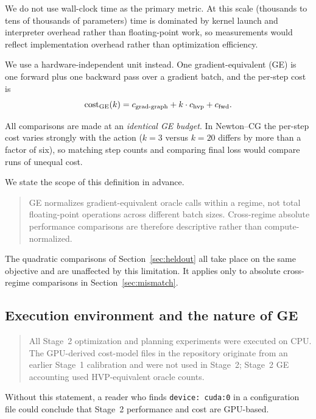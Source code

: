 We do not use wall-clock time as the primary metric. At this scale (thousands to
tens of thousands of parameters) time is dominated by kernel launch and
interpreter overhead rather than floating-point work, so measurements would
reflect implementation overhead rather than optimization efficiency.

We use a hardware-independent unit instead. One gradient-equivalent (GE) is one
forward plus one backward pass over a gradient batch, and the per-step cost is
\begin{equation}
  \mathrm{cost}_{\text{GE}}(k) = c_{\text{grad-graph}} + k \cdot c_{\text{hvp}}
    + c_{\text{fwd}} .
\end{equation}

All comparisons are made at an \emph{identical GE budget}. In Newton--CG the
per-step cost varies strongly with the action ($k = 3$ versus $k = 20$ differs by
more than a factor of six), so matching step counts and comparing final loss
would compare runs of unequal cost.

We state the scope of this definition in advance.

\begin{quote}
GE normalizes gradient-equivalent oracle calls within a regime, not total
floating-point operations across different batch sizes. Cross-regime absolute
performance comparisons are therefore descriptive rather than compute-normalized.
\end{quote}

The quadratic comparisons of Section~\ref{sec:heldout} all take place on the same
objective and are unaffected by this limitation. It applies only to absolute
cross-regime comparisons in Section~\ref{sec:mismatch}.

\subsection{Execution environment and the nature of GE}
\label{sec:cpu}

\begin{quote}
All Stage~2 optimization and planning experiments were executed on CPU. The
GPU-derived cost-model files in the repository originate from an earlier Stage~1
calibration and were not used in Stage~2; Stage~2 GE accounting used
HVP-equivalent oracle counts.
\end{quote}

Without this statement, a reader who finds \texttt{device: cuda:0} in a
configuration file could conclude that Stage~2 performance and cost are
GPU-based.

